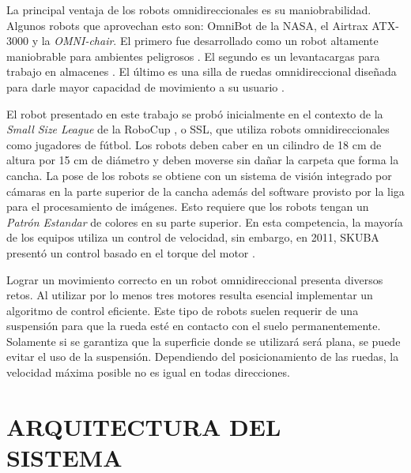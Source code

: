 \documentclass[twocolumn,10pt]{amrob}
\newcommand{\TODO}[1]{{\color{red}{TODO: {#1}}}}
\begin{document}
La principal ventaja de los robots omnidireccionales es su maniobrabilidad. Algunos robots que aprovechan esto son: OmniBot de la NASA, el Airtrax ATX-3000 y la \textit{OMNI-chair}. El primero fue desarrollado como un robot altamente maniobrable para ambientes peligrosos \cite{houshangi1999omnibot}. El segundo es un levantacargas para trabajo en almacenes \cite{aduascualictei2011practical}. El último es una silla de ruedas omnidireccional diseñada para darle mayor capacidad de movimiento a su usuario \cite{borgolte1998architectural}.

El robot presentado en este trabajo se probó inicialmente en el contexto de la \emph{Small Size League} de la RoboCup \cite{sslWiki}, o SSL, que utiliza robots omnidireccionales como jugadores de fútbol. Los robots deben caber en un cilindro de 18 cm de altura por 15 cm de diámetro y deben moverse sin dañar la carpeta que forma la cancha. La pose de los robots se obtiene con un sistema de visión integrado por cámaras en la parte superior de la cancha además del software provisto por la liga para el procesamiento de imágenes. Esto requiere que los robots tengan un \textit{Patrón Estandar} de colores en su parte superior. En esta competencia, la mayoría de los equipos utiliza un control de velocidad, sin embargo, en 2011, SKUBA presentó un control basado en el torque del motor \cite{chaisoskuba}. 

Lograr un movimiento correcto en un robot omnidireccional presenta diversos retos. Al utilizar por lo menos tres motores resulta esencial implementar un algoritmo de control eficiente. Este tipo de robots suelen requerir de una suspensión para que la rueda esté en contacto con el suelo permanentemente. Solamente si se garantiza que la superficie donde se utilizará será plana, se puede evitar el uso de la suspensión. Dependiendo del posicionamiento de las ruedas, la velocidad máxima posible no es igual en todas direcciones. 



\section*{ARQUITECTURA DEL SISTEMA}
\end{document}

